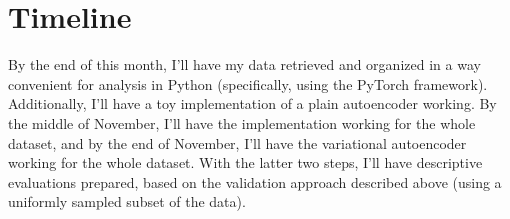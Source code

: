 \documentclass[12pt]{article}
\begin{document}
    \section{Timeline}
    By the end of this month, I'll have my data retrieved and organized in a way convenient for analysis in Python (specifically, using the PyTorch framework). Additionally, I'll have a toy implementation of a plain autoencoder working. By the middle of November, I'll have the implementation working for the whole dataset, and by the end of November, I'll have the variational autoencoder working for the whole dataset. With the latter two steps, I'll have descriptive evaluations prepared, based on the validation approach described above (using a uniformly sampled subset of the data). 
    
\end{document}
